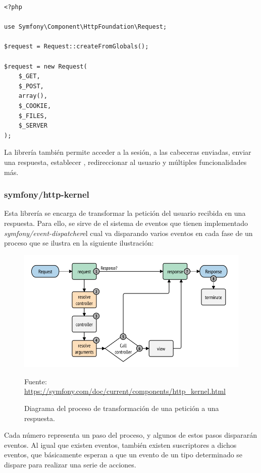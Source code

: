 \begin{verbatim}
<?php

use Symfony\Component\HttpFoundation\Request;

$request = Request::createFromGlobals();

$request = new Request(
    $_GET,
    $_POST,
    array(),
    $_COOKIE,
    $_FILES,
    $_SERVER
);
\end{verbatim}

La librería también permite acceder a la sesión, a las cabeceras enviadas,
enviar una respuesta, establecer , redireccionar
al usuario y múltiples funcionalidades más.

\subsubsection{symfony/http-kernel}
Esta librería se encarga de transformar la petición del usuario recibida en
una respuesta. Para ello, se sirve de el sistema de eventos que tienen
implementado \textemdash \textit{symfony/event-dispatcher}\textemdash el cual
va disparando varios eventos en cada fase de un proceso que se ilustra en la
siguiente ilustración:

\begin{figure}[h]
    \center
    \includegraphics[scale=0.3]{img/http-workflow}
    \caption{Diagrama del proceso de transformación de una petición a una
        respuesta.}
    Fuente: \url{https://symfony.com/doc/current/components/http_kernel.html}
\end{figure}

Cada número representa un paso del proceso, y algunos de estos pasos dispararán
eventos. Al igual que existen eventos, también existen suscriptores a dichos
eventos, que básicamente esperan a que un evento de un tipo determinado se
dispare para realizar una serie de acciones.

